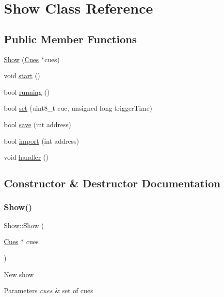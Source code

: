 \hypertarget{class_show}{}\section{Show Class Reference}
\label{class_show}
\subsection*{Public Member Functions}
\begin{DoxyCompactItemize}
\item 
\hyperlink{class_show_a58a3196a85a9c3e1b1c63d285b856b98}{Show} (\hyperlink{class_cues}{Cues} $\ast$cues)
\item 
void \hyperlink{class_show_a29cf4d64bab00f43e2873f463ae12a45}{start} ()
\item 
bool \hyperlink{class_show_a7e550a1e7b0a11b290296adb4490e294}{running} ()
\item 
bool \hyperlink{class_show_ac4c870b4c29dac52a9bb41a99ab9fb6c}{set} (uint8\+\_\+t cue, unsigned long trigger\+Time)
\item 
bool \hyperlink{class_show_a8369b14a9b23c90f2c903aa0934da713}{save} (int address)
\item 
bool \hyperlink{class_show_a5b0ec76ffad16e42d14d9738a64d7181}{import} (int address)
\item 
void \hyperlink{class_show_a659057610d0df455128bfae9d27e7fc8}{handler} ()
\end{DoxyCompactItemize}


\subsection{Constructor \& Destructor Documentation}
\mbox{\label{class_show_a58a3196a85a9c3e1b1c63d285b856b98}} 
\subsubsection{\texorpdfstring{Show()}{Show()}}
{\footnotesize\ttfamily Show\+::\+Show (\begin{DoxyParamCaption}\item[{\hyperlink{class_cues}{Cues} $\ast$}]{cues }\end{DoxyParamCaption})}

New show 
\begin{DoxyParams}{Parameters}
{\em cues} & set of cues \\
\hline
\end{DoxyParams}


